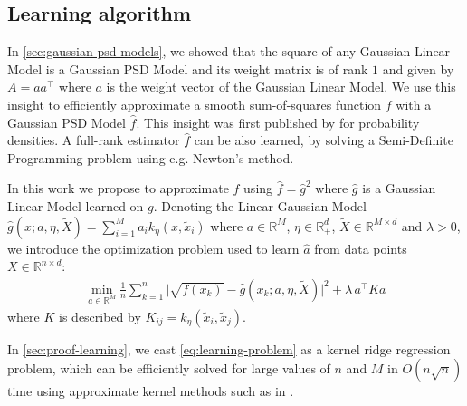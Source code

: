 \subsection{Learning algorithm}\label{sec:optimization}

In \cref{sec:gaussian-psd-models}, we showed that the square of any Gaussian Linear Model is a Gaussian PSD Model and its weight matrix is of rank $1$ and given by $A =aa^\top $ where $a$ is the weight vector of the Gaussian Linear Model. We use this insight to efficiently approximate a smooth sum-of-squares function $f$ with a Gaussian PSD Model $\hat f$. This insight was first published by \cite{sampling-ulysse} for probability densities. A full-rank estimator $\hat f$ can be also learned, by solving a Semi-Definite Programming problem using e.g. Newton's method.


In this work we propose to approximate $f$ using $\hat f= \hat g^2$ where $\hat g$ is a Gaussian Linear Model learned on $g$. Denoting the Linear Gaussian Model $\hat g(x ; a, \eta, \tilde X) = \sum_{i=1}^M a_ik_\eta(x, \tilde x_i)$ where $a\in\mathbb R^M$, $\eta \in \mathbb R_+^d$, $\tilde X \in \mathbb R^{M\times d}$ and $\lambda > 0$, we introduce the optimization problem used to learn $\hat a$ from data points $X\in\mathbb R^{n\times d}$:
\begin{align}\label{eq:learning-problem}
\min_{a \in\mathbb R^M} \frac{1}{n}\sum_{k=1}^n \vert \sqrt{f(x_k)} - \hat g(x_k ; a, \eta, \tilde X)\vert^2+ \lambda \, a^\top Ka
\end{align}
where $K$ is described by $K_{ij}=k_\eta(\tilde x_i, \tilde x_j)$.

In \cref{sec:proof-learning}, we cast \cref{eq:learning-problem} as a kernel ridge regression problem, which can be efficiently solved for large values of $n$ and $M$ in $O(n\sqrt{n})$ time using approximate kernel methods such as in \cite{falkon}.

